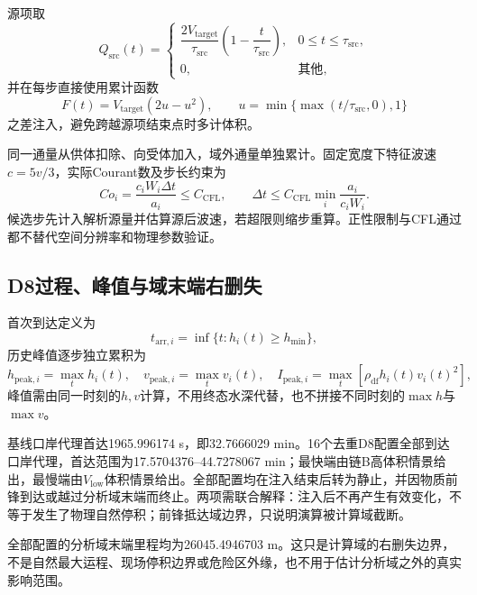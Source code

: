 源项取
\begin{equation}
Q_{\mathrm{src}}(t)=
\begin{cases}
\dfrac{2V_{\mathrm{target}}}{\tau_{\mathrm{src}}}
\left(1-\dfrac{t}{\tau_{\mathrm{src}}}\right),&0\le t\le\tau_{\mathrm{src}},\\
0,&\text{其他},
\end{cases}
\end{equation}
并在每步直接使用累计函数
\begin{equation}
F(t)=V_{\mathrm{target}}(2u-u^2),
\qquad
u=\min\{\max(t/\tau_{\mathrm{src}},0),1\}
\end{equation}
之差注入，避免跨越源项结束点时多计体积。

同一通量从供体扣除、向受体加入，域外通量单独累计。固定宽度下特征波速$c=5v/3$，实际Courant数及步长约束为
\begin{equation}
Co_i=\frac{c_iW_i\Delta t}{a_i}\le C_{\mathrm{CFL}},
\qquad
\Delta t\le
C_{\mathrm{CFL}}\min_i\frac{a_i}{c_iW_i}.
\end{equation}
候选步先计入解析源量并估算源后波速，若超限则缩步重算。正性限制与CFL通过都不替代空间分辨率和物理参数验证。

\subsection{D8过程、峰值与域末端右删失}
首次到达定义为
\begin{equation}
t_{\mathrm{arr},i}=\inf\{t:h_i(t)\ge h_{\min}\},
\end{equation}
历史峰值逐步独立累积为
\begin{equation}
h_{\mathrm{peak},i}=\max_t h_i(t),\quad
v_{\mathrm{peak},i}=\max_t v_i(t),\quad
I_{\mathrm{peak},i}=\max_t\left[\rho_{\mathrm{df}}h_i(t)v_i(t)^2\right],
\end{equation}
峰值需由同一时刻的$h,v$计算，不用终态水深代替，也不拼接不同时刻的$\max h$与$\max v$。

基线口岸代理首达1965.996174 s，即32.7666029 min。16个去重D8配置全部到达口岸代理，首达范围为17.5704376--44.7278067 min；最快端由链B高体积情景给出，最慢端由$V_{\mathrm{low}}$体积情景给出。全部配置均在注入结束后转为静止，并因物质前锋到达或越过分析域末端而终止。两项需联合解释：注入后不再产生有效变化，不等于发生了物理自然停积；前锋抵达域边界，只说明演算被计算域截断。

全部配置的分析域末端里程均为26045.4946703 m。这只是计算域的右删失边界，不是自然最大运程、现场停积边界或危险区外缘，也不用于估计分析域之外的真实影响范围。

